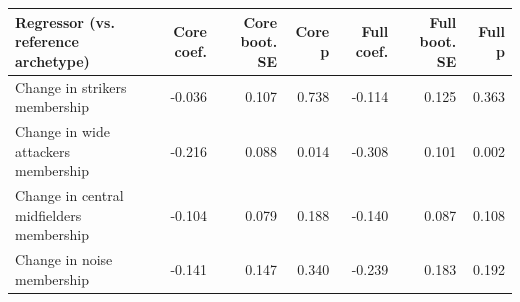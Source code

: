 \begin{tabular}{lrrrrrr}
\toprule
Regressor (vs. reference archetype) & Core coef. & Core boot. SE & Core p & Full coef. & Full boot. SE & Full p \\
\midrule
Change in strikers membership & -0.036 & 0.107 & 0.738 & -0.114 & 0.125 & 0.363 \\
Change in wide attackers membership & -0.216 & 0.088 & 0.014 & -0.308 & 0.101 & 0.002 \\
Change in central midfielders membership & -0.104 & 0.079 & 0.188 & -0.140 & 0.087 & 0.108 \\
Change in noise membership & -0.141 & 0.147 & 0.340 & -0.239 & 0.183 & 0.192 \\
\bottomrule
\end{tabular}

